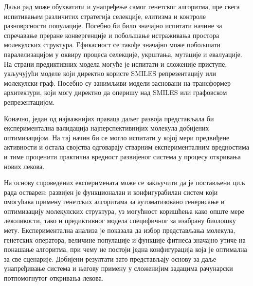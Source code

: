 \documentclass[12pt,oneside]{memoir}
\begin{document}
Даљи рад може обухватити и унапређење самог генетског алгоритма, 
пре свега испитивањем различитих стратегија селекције, 
елитизма и контроле разноврсности популације. Посебно би 
било значајно испитати начине за спречавање преране 
конвергенције и побољшање истраживања простора молекулских 
структура. Ефикасност се такође значајно може побољшати 
паралелизацијом у оквиру процеса селекције, укрштања, мутације и 
евалуације.
На страни предиктивних модела могуће је испитати 
и сложеније приступе, укључујући моделе који директно 
користе SMILES репрезентацију или молекулски граф. Посебно су 
занимљиви модели засновани на трансформер архитектури, који 
могу директно да оперишу над SMILES или графовском репрезентацијом.

Коначно, један од најважнијих праваца даљег развоја 
представљала би експериментална валидација најперспективнијих 
молекула добијених оптимизацијом. На тај начин би се могло 
испитати у којој мери предвиђене активности и остала својства 
одговарају стварним експерименталним вредностима и тиме 
проценити практична вредност развијеног система у процесу 
откривања нових лекова.

На основу спроведених експеримената може се закључити да је 
постављени циљ рада остварен: развијен је функционалан и 
конфигурабилан систем који омогућава примену генетских 
алгоритама за аутоматизовано генерисање и оптимизацију 
молекулских структура, уз могућност коришћења како 
опште мере леколикости, тако и предиктивног модела 
специфичног за изабрану биолошку мету. Експериментална 
анализа је показала да избор представљања молекула, 
генетских оператора, величине популације и функције фитнеса 
значајно утиче на понашање алгоритма, при чему не постоји 
једна конфигурација која је оптимална за све сценарије. 
Добијени резултати зато представљају основу за даље 
унапређивање система и његову примену у сложенијим задацима 
рачунарски потпомогнутог откривања лекова.

\literatura

\backmatter
\end{document}
